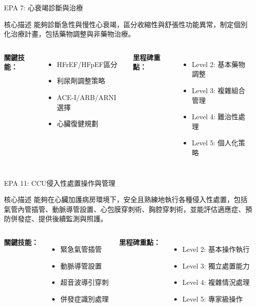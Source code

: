 \documentclass[aspectratio=169]{beamer}
\begin{document}
\begin{frame}{EPA 7: 心衰竭診斷與治療}
\begin{alertblock}{核心描述}
能夠診斷急性與慢性心衰竭，區分收縮性與舒張性功能異常，制定個別化治療計畫，包括藥物調整與非藥物治療。
\end{alertblock}

\begin{columns}[c]
\textbf{關鍵技能：}
\begin{itemize}
\item HFrEF/HFpEF區分
\item 利尿劑調整策略
\item ACE-I/ARB/ARNI選擇
\item 心臟復健規劃
\end{itemize}

\textbf{里程碑重點：}
\begin{itemize}
\item Level 2: 基本藥物調整
\item Level 3: 複雜組合管理
\item Level 4: 難治性處理
\item Level 5: 個人化策略
\end{itemize}
\end{columns}
\end{frame}

\begin{frame}{EPA 11: CCU侵入性處置操作與管理}
\begin{alertblock}{核心描述}
能夠在心臟加護病房環境下，安全且熟練地執行各種侵入性處置，包括氣管內管插管、動脈導管設置、心包膜穿刺術、胸腔穿刺術，並能評估適應症、預防併發症、提供後續監測與照護。
\end{alertblock}

\begin{columns}[c]
\textbf{關鍵技能：}
\begin{itemize}
\item 緊急氣管插管
\item 動脈導管設置
\item 超音波導引穿刺
\item 併發症識別處理
\end{itemize}

\textbf{里程碑重點：}
\begin{itemize}
\item Level 2: 基本操作執行
\item Level 3: 獨立處置能力
\item Level 4: 複雜情況處理
\item Level 5: 專家級操作
\end{itemize}
\end{columns}
\end{frame}
\end{document}
